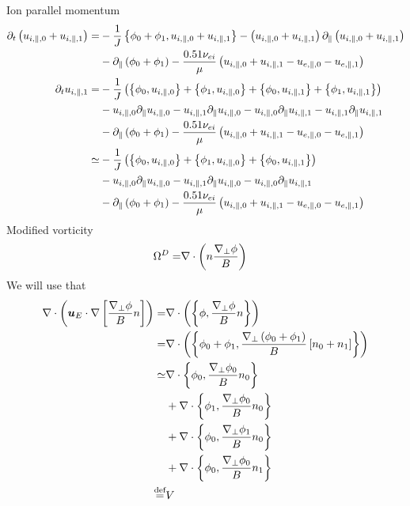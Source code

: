 Ion parallel momentum
\begin{align*}
\partial_t \left( u_{i,\|,0}+ u_{i,\|,1} \right)
 =&
 -\frac{1}{J}\left\{ \phi_0 + \phi_1 , u_{i,\|,0}+ u_{i,\|,1} \right\}
 -
\left( u_{i,\|,0}+ u_{i,\|,1} \right)
 \partial_\|
 \left( u_{i,\|,0}+ u_{i,\|,1} \right)
 \\&
- \partial_\|\left(\phi_0 + \phi_1\right)
 - \frac{ 0.51 \nu_{ei} }{ \mu } \left(
 u_{i,\|,0}+ u_{i,\|,1}
 - u_{e,\|,0}- u_{e,\|,1}
 \right)
 \\
 \partial_t u_{i,\|,1}
 =&
 -\frac{1}{J}\left(
   \left\{\phi_0,u_{i,\|,0}\right\}
 + \left\{\phi_1,u_{i,\|,0}\right\}
 + \left\{\phi_0,u_{i,\|,1}\right\}
 + \left\{\phi_1,u_{i,\|,1}\right\}
 \right)
\\&
 - u_{i,\|,0} \partial_\| u_{i,\|,0}
 - u_{i,\|,1} \partial_\| u_{i,\|,0}
 - u_{i,\|,0} \partial_\| u_{i,\|,1}
 - u_{i,\|,1} \partial_\| u_{i,\|,1}
 \\&
- \partial_\|\left(\phi_0 + \phi_1\right)
 - \frac{ 0.51 \nu_{ei} }{ \mu } \left(
 u_{i,\|,0}+ u_{i,\|,1}
 - u_{e,\|,0}- u_{e,\|,1}
 \right)
 \\
 \simeq&
 -\frac{1}{J}\left(
   \left\{\phi_0,u_{i,\|,0}\right\}
 + \left\{\phi_1,u_{i,\|,0}\right\}
 + \left\{\phi_0,u_{i,\|,1}\right\}
 \right)
\\&
 - u_{i,\|,0} \partial_\| u_{i,\|,0}
 - u_{i,\|,1} \partial_\| u_{i,\|,0}
 - u_{i,\|,0} \partial_\| u_{i,\|,1}
 \\&
- \partial_\|\left(\phi_0 + \phi_1\right)
 - \frac{ 0.51 \nu_{ei} }{ \mu } \left(
 u_{i,\|,0}+ u_{i,\|,1}
 - u_{e,\|,0}- u_{e,\|,1}
 \right)
\end{align*}
Modified vorticity
\begin{align*}
\Omega^D =& \nabla\cdot\left(n\frac{\nabla_\perp\phi}{B}\right)
\end{align*}
We will use that
\begin{align*}
    \nabla\cdot \left( \boldsymbol{u}_E\cdot\nabla \left[\frac{\nabla_\perp \phi}{B}n \right] \right)
    =&
    \nabla\cdot \left( \left\{\phi, \frac{\nabla_\perp \phi}{B}n \right\} \right)
    \\
    =&
    \nabla\cdot \left( \left\{\phi_0 + \phi_1, \frac{\nabla_\perp \left(\phi_0 + \phi_1\right)}{B}\left[n_0 + n_1\right] \right\} \right)
    \\
    \simeq&
    \nabla\cdot  \left\{\phi_0, \frac{\nabla_\perp \phi_0}{B}n_0 \right\}
    \\ &
    + \nabla\cdot  \left\{\phi_1, \frac{\nabla_\perp \phi_0}{B}n_0 \right\}
    \\&
    + \nabla\cdot  \left\{\phi_0, \frac{\nabla_\perp \phi_1}{B}n_0 \right\}
    \\&
    + \nabla\cdot  \left\{\phi_0, \frac{\nabla_\perp \phi_0}{B}n_1 \right\}
    \\
    \overset{\text{def}}{=}& V
\end{align*}

